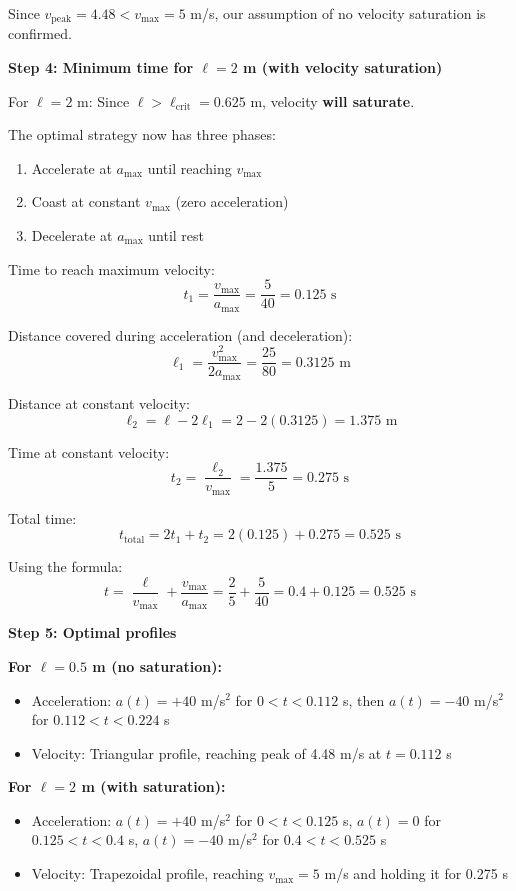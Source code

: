 \documentclass[11pt,a4paper]{article}
\begin{document}
Since $v_{\text{peak}} = 4.48 < v_{\max} = 5$ m/s, our assumption of no velocity saturation is confirmed.

\textbf{Step 4: Minimum time for $\ell = 2$ m (with velocity saturation)}

For $\ell = 2$ m: Since $\ell > \ell_{\text{crit}} = 0.625$ m, velocity \textbf{will saturate}.

The optimal strategy now has three phases:
\begin{enumerate}
\item Accelerate at $a_{\max}$ until reaching $v_{\max}$
\item Coast at constant $v_{\max}$ (zero acceleration)
\item Decelerate at $a_{\max}$ until rest
\end{enumerate}

Time to reach maximum velocity:
\[
t_1 = \frac{v_{\max}}{a_{\max}} = \frac{5}{40} = 0.125 \text{ s}
\]

Distance covered during acceleration (and deceleration):
\[
\ell_1 = \frac{v_{\max}^2}{2a_{\max}} = \frac{25}{80} = 0.3125 \text{ m}
\]

Distance at constant velocity:
\[
\ell_2 = \ell - 2\ell_1 = 2 - 2(0.3125) = 1.375 \text{ m}
\]

Time at constant velocity:
\[
t_2 = \frac{\ell_2}{v_{\max}} = \frac{1.375}{5} = 0.275 \text{ s}
\]

Total time:
\[
t_{\text{total}} = 2t_1 + t_2 = 2(0.125) + 0.275 = 0.525 \text{ s}
\]

Using the formula:
\[
t = \frac{\ell}{v_{\max}} + \frac{v_{\max}}{a_{\max}} = \frac{2}{5} + \frac{5}{40} = 0.4 + 0.125 = 0.525 \text{ s}
\]

\textbf{Step 5: Optimal profiles}

\textbf{For $\ell = 0.5$ m (no saturation):}
\begin{itemize}
\item Acceleration: $a(t) = +40$ m/s$^2$ for $0 < t < 0.112$ s, then $a(t) = -40$ m/s$^2$ for $0.112 < t < 0.224$ s
\item Velocity: Triangular profile, reaching peak of 4.48 m/s at $t = 0.112$ s
\end{itemize}

\textbf{For $\ell = 2$ m (with saturation):}
\begin{itemize}
\item Acceleration: $a(t) = +40$ m/s$^2$ for $0 < t < 0.125$ s, $a(t) = 0$ for $0.125 < t < 0.4$ s, $a(t) = -40$ m/s$^2$ for $0.4 < t < 0.525$ s
\item Velocity: Trapezoidal profile, reaching $v_{\max} = 5$ m/s and holding it for 0.275 s
\end{itemize}
\end{document}
